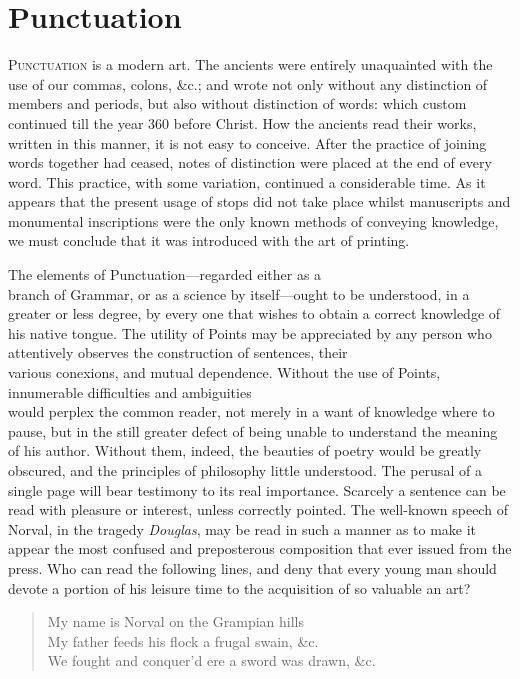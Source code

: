 \chapter{Punctuation}
\textsc{Punctuation} is a modern art. The ancients were entirely unaquainted
with the use of our commas, colons, \&c.; and wrote not only without any
distinction of members and periods, but also without distinction of words: which
custom continued till the year 360 before Christ. How the ancients read their
works, written in this manner, it is not easy to conceive. After the practice of
joining words together had ceased, notes of distinction were placed at the end
of every word. This practice, with some variation, continued a considerable
time. As it appears that the present usage of stops did not take place whilst
manuscripts and monumental inscriptions were the only known methods of conveying
knowledge, we must conclude that it was introduced with the art of printing.

The elements of Punctuation---regarded either as a\\branch of Grammar, or as a
science by itself---ought to be understood, in a greater or less degree, by
every one that wishes to obtain a correct knowledge of his native tongue. The
utility of Points may be appreciated by any person who attentively observes the
construction of sentences, their\\various conexions, and mutual dependence.
Without the use of Points, innumerable difficulties and ambiguities\\would
perplex the common reader, not merely in a want of knowledge where to pause, but
in the still greater defect of being unable to understand the meaning of his
author. Without them, indeed, the beauties of poetry would be greatly obscured,
and the principles of philosophy little understood. The perusal of a single page
will bear testimony to its real importance. Scarcely a sentence can be read with
pleasure or interest, unless correctly pointed. The well-known speech of Norval,
in the tragedy \emph{Douglas}, may be read in such a manner as to make it appear
the most confused and preposterous composition that ever issued from the press.
Who can read the following lines, and deny that every young man should devote a
portion of his leisure time to the acquisition of so valuable an art?

\begin{quote}
    \small
    My name is Norval on the Grampian hills\\
    My father feeds his flock a frugal swain, \&c.\\
    We fought and conquer'd ere a sword was drawn, \&c.
    \normalsize
\end{quote}

